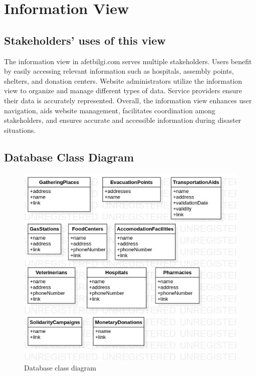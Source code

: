 \documentclass[12pt]{report}
\begin{document}
\section{Information View}

\subsection{Stakeholders' uses of this view}
The information view in afetbilgi.com serves multiple stakeholders. Users benefit by easily accessing relevant information such as 
hospitals, assembly points, shelters, and donation centers. Website administrators utilize the information view to organize and manage 
different types of data. Service providers ensure their data is accurately represented. Overall, the information view enhances user navigation, aids 
website management, facilitates coordination among stakeholders, and ensures accurate and accessible information during disaster situations.

\subsection{Database Class Diagram}
\begin{figure}[H]
    \includegraphics[scale=0.6]{db1}
    \centering
    \caption{Database class diagram}
\end{figure}
\end{document}
